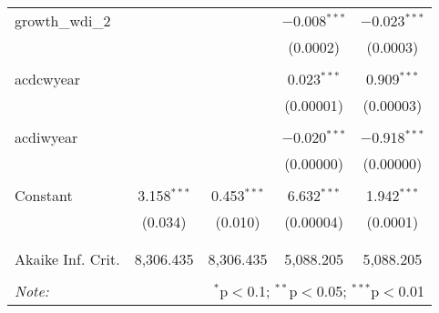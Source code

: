 \begin{table}[!htbp]
\begin{tabular}{@{\extracolsep{5pt}}lcccc}
 growth\_wdi\_2 &  &  & $-$0.008$^{***}$ & $-$0.023$^{***}$ \\ 
  &  &  & (0.0002) & (0.0003) \\ 
  & & & & \\ 
 acdcwyear &  &  & 0.023$^{***}$ & 0.909$^{***}$ \\ 
  &  &  & (0.00001) & (0.00003) \\ 
  & & & & \\ 
 acdiwyear &  &  & $-$0.020$^{***}$ & $-$0.918$^{***}$ \\ 
  &  &  & (0.00000) & (0.00000) \\ 
  & & & & \\ 
 Constant & 3.158$^{***}$ & 0.453$^{***}$ & 6.632$^{***}$ & 1.942$^{***}$ \\ 
  & (0.034) & (0.010) & (0.00004) & (0.0001) \\ 
  & & & & \\ 
\hline \\[-1.8ex] 
Akaike Inf. Crit. & 8,306.435 & 8,306.435 & 5,088.205 & 5,088.205 \\ 
\hline 
\hline \\[-1.8ex] 
\textit{Note:}  & \multicolumn{4}{r}{$^{*}$p$<$0.1; $^{**}$p$<$0.05; $^{***}$p$<$0.01} \\ 
\end{tabular} 
\end{table} 
